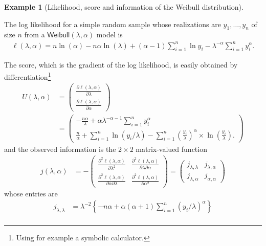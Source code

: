 \documentclass[
  11pt,
  letterpaper,
]{scrbook}
\theoremstyle{definition}
\theoremstyle{definition}
\newtheorem{example}{Example}[chapter]
\theoremstyle{definition}
\theoremstyle{plain}
\theoremstyle{plain}
\theoremstyle{remark}
\begin{document}
\begin{example}[Likelihood, score and information of the Weibull
distribution]\protect\hypertarget{exm-weibull-info}{}\label{exm-weibull-info}

The log likelihood for a simple random sample whose realizations are
\(y_1, \ldots, y_n\) of size \(n\) from a
\(\mathsf{Weibull}(\lambda, \alpha)\) model is \begin{align*}
\ell(\lambda, \alpha) = n \ln(\alpha) - n\alpha\ln(\lambda) + (\alpha-1) \sum_{i=1}^n \ln y_i  - \lambda^{-\alpha}\sum_{i=1}^n y_i^\alpha.
\end{align*}

The score, which is the gradient of the log likelihood, is easily
obtained by differentiation\footnote{Using for example a symbolic
  calculator.} \begin{align*}
U(\lambda, \alpha) &= \begin{pmatrix}\frac{\partial \ell(\lambda, \alpha)}{\partial \lambda} \\
\frac{\partial \ell(\lambda, \alpha)}{\partial \alpha} \end{pmatrix} \\&=
\begin{pmatrix}
 -\frac{n\alpha}{\lambda} +\alpha\lambda^{-\alpha-1}\sum_{i=1}^n y_i^\alpha
 \\
 \frac{n}{\alpha} + \sum_{i=1}^n \ln (y_i/\lambda)  - \sum_{i=1}^n \left(\frac{y_i}{\lambda}\right)^{\alpha} \times\ln\left(\frac{y_i}{\lambda}\right).
 \end{pmatrix}
\end{align*} and the observed information is the \(2 \times 2\)
matrix-valued function \begin{align*}
j(\lambda, \alpha) &= - \begin{pmatrix}
\frac{\partial^2 \ell(\lambda, \alpha)}{\partial \lambda^2} &  \frac{\partial^2 \ell(\lambda, \alpha)}{\partial \lambda \partial \alpha} \\ \frac{\partial^2 \ell(\lambda, \alpha)}{\partial \alpha \partial \lambda} & \frac{\partial^2 \ell(\lambda, \alpha)}{\partial \alpha^2}
\end{pmatrix}  = \begin{pmatrix} j_{\lambda, \lambda} & j_{\lambda, \alpha} \\ j_{\lambda, \alpha} & j_{\alpha, \alpha} \end{pmatrix}
\end{align*} whose entries are \begin{align*}
j_{\lambda, \lambda} &= \lambda^{-2}\left\{-n\alpha + \alpha(\alpha+1)\sum_{i=1}^n (y_i/\lambda)^\alpha\right\} \\

\end{align*}
\end{example}
\end{document}
